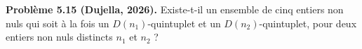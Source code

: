 \textbf{Problème 5.15 (Dujella, 2026).} Existe-t-il un ensemble de cinq entiers non nuls qui soit à la fois un $D(n_1)$-quintuplet et un $D(n_2)$-quintuplet, pour deux entiers non nuls distincts $n_1$ et $n_2$ ?
